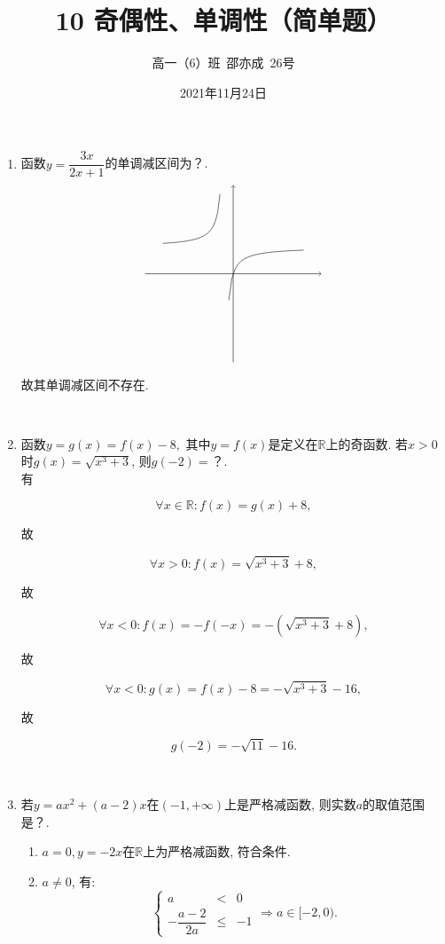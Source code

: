 \documentclass[8pt]{article}
\author{高一（6）班\ 邵亦成\ 26号}
\title{10 奇偶性、单调性（简单题）}
\date{2021年11月24日}
\begin{document}
	\maketitle

	\begin{enumerate}[label=\arabic*.]
		\item 函数$y=\dfrac{3x}{2x+1}$的单调减区间为？.
			~\\

			$$
			\begin{tikzpicture}[scale=0.5, declare function={f(\x) = 3*\x/(2*\x+1);}]
	    		\draw[black, ->] (-5,  0)--( 5,  0);
	    		\draw[black, ->] ( 0, -5)--( 0,  5);
	    		\draw[black, domain=-4:-0.75] plot({\x}, {f(\x)});
	    		\draw[black, domain=-0.25:4] plot({\x}, {f(\x)});
			\end{tikzpicture}
			$$

			故其单调减区间不存在.

		~\\

		\item 函数$y=g(x)=f(x)-8,$ 其中$y=f(x)$是定义在$\mathbb{R}$上的奇函数. 若$x>0$时$g(x)=\sqrt{x^3+3}$, 则$g(-2)=$？.
			~\\

			有

			$$\forall x \in \mathbb{R}: f(x)=g(x)+8,$$

			故

			$$\forall x>0: f(x)=\sqrt{x^3+3}+8,$$

			故

			$$\forall x<0: f(x)=-f(-x)=-\left(\sqrt{x^3+3}+8\right),$$

			故

			$$\forall x<0: g(x)=f(x)-8=-\sqrt{x^3+3}-16,$$

			故

			$$g(-2)=-\sqrt{11}-16.$$

		~\\

		\item 若$y=ax^2+(a-2)x$在$(-1, +\infty)$上是严格减函数, 则实数$a$的取值范围是？.
			~\\

			\begin{enumerate}[label=$\arabic*^{\circ}$]
				\item $a=0, y=-2x$在$\mathbb{R}$上为严格减函数, 符合条件.

				\item $a\neq 0$, 有:
					$$\left\{\begin{array}{rcl}a&<&0\\-\dfrac{a-2}{2a}&\leq&-1\end{array}\right.\Rightarrow a\in[-2, 0).$$
			\end{enumerate}


\end{enumerate}
\end{document}
